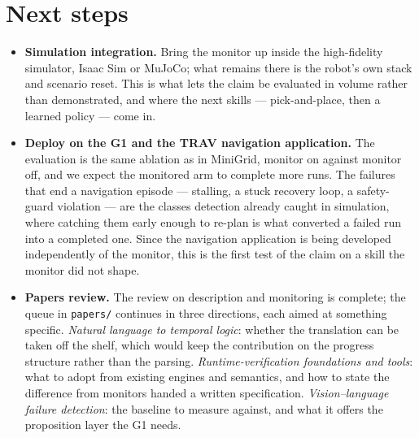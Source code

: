 \documentclass[11pt,a4paper]{article}
\begin{document}
\section{Next steps}

\begin{itemize}
\item \textbf{Simulation integration.} Bring the monitor up inside the high-fidelity
simulator, Isaac Sim or MuJoCo; what remains there is the robot's own stack and scenario
reset. This is what lets the claim be evaluated in volume rather than demonstrated, and where
the next skills --- pick-and-place, then a learned policy --- come in.

\item \textbf{Deploy on the G1 and the TRAV navigation application.} The evaluation is the
same ablation as in MiniGrid, monitor on against monitor off, and we expect the monitored
arm to complete more runs. The failures that end a navigation episode --- stalling, a stuck
recovery loop, a safety-guard violation --- are the classes detection already caught in
simulation, where catching them early enough to re-plan is what converted a failed run into
a completed one. Since the navigation application is being developed independently of the
monitor, this is the first test of the claim on a skill the monitor did not shape.

\item \textbf{Papers review.} The review on description and monitoring is complete; the queue
in \texttt{papers/} continues in three directions, each aimed at something specific.
\emph{Natural language to temporal logic}: whether the translation can be taken off the
shelf, which would keep the contribution on the progress structure rather than the parsing.
\emph{Runtime-verification foundations and tools}: what to adopt from existing engines and
semantics, and how to state the difference from monitors handed a written specification.
\emph{Vision--language failure detection}: the baseline to measure against, and what it
offers the proposition layer the G1 needs.
\end{itemize}
\end{document}
